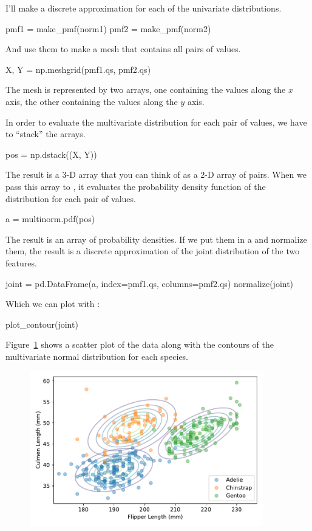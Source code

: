 \documentclass[12pt]{book}
\theoremstyle{exercise}
\begin{document}
I'll make a discrete  approximation for
each of the univariate distributions.

\begin{code}
pmf1 = make_pmf(norm1)
pmf2 = make_pmf(norm2)
\end{code}

And use them to make a mesh that contains all pairs of values.

\begin{code}
X, Y = np.meshgrid(pmf1.qs, pmf2.qs)
\end{code}

The mesh is represented by two arrays, one containing the values along
the $x$ axis, the other containing the values along the $y$ axis.

In order to evaluate the multivariate distribution for each pair of
values, we have to ``stack'' the arrays.

\begin{code}
pos = np.dstack((X, Y))
\end{code}

The result is a 3-D array that you can think of as a 2-D array of pairs.
When we pass this array to , it
evaluates the probability density function of the distribution for each
pair of values.

\begin{code}
a = multinorm.pdf(pos)
\end{code}

The result is an array of probability densities. If we put them in a
 and normalize them, the result is a
discrete approximation of the joint distribution of the two features.

\begin{code}
joint = pd.DataFrame(a, index=pmf1.qs, columns=pmf2.qs)
normalize(joint)
\end{code}

Which we can plot with :

\begin{code}
plot_contour(joint)
\end{code}

Figure~\ref{fig10-04} shows a scatter plot of the data along with the
contours of the multivariate normal distribution for each species.

\begin{figure}
\centerline{\includegraphics[width=4in]{figs/fig10-04.pdf}}
\caption{}
\label{fig10-04}
\end{figure}
\end{document}
